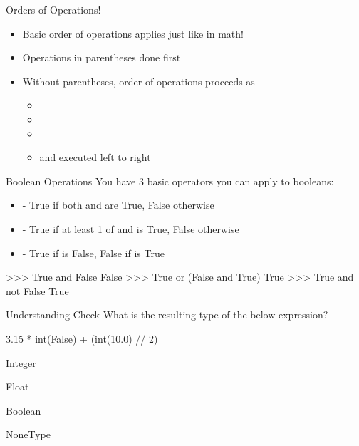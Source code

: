 \documentclass[pdf, aspectratio=169, 12pt]{beamer}
\begin{document}
\begin{frame}{Orders of Operations!}
	\begin{itemize}
		\item Basic order of operations applies just like in math!
		\item Operations in parentheses done first
		\item Without parentheses, order of operations proceeds as
			\begin{itemize}
				\item \pyi{**}
				\item \pyi{*}
				\item \pyi{/}
				\item \pyi{+} and \pyi{-} executed left to right
			\end{itemize}
	\end{itemize}
\end{frame}

\begin{frame}[fragile]{Boolean Operations}
	\vspace{5mm}
	You have 3 basic operators you can apply to booleans:
	\begin{itemize}
		\item {} - True if both  and  are True, False otherwise
		\item {} - True if at least 1 of  and  is True, False otherwise
		\item {} - True if  is False, False if  is True
	\end{itemize}
	\begin{pythoncode}[numbers=none]
		>>> True and False
		False
		>>> True or (False and True)
		True
		>>> True and not False
		True
	\end{pythoncode}
\end{frame}

\begin{frame}[fragile]{Understanding Check}
	What is the resulting type of the below expression?
	\begin{pythoncode}
		3.15 * int(False) + (int(10.0) // 2)
	\end{pythoncode}
	\begin{poll}
	\item Integer
	\item Float
	\item Boolean
	\item NoneType
	\end{poll}
\end{frame}
\end{document}
